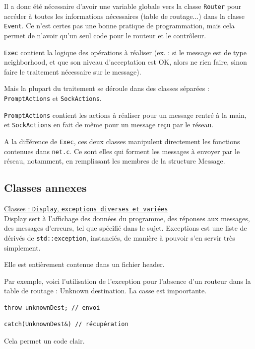 \documentclass[a4paper,11pt]{article}
\begin{document}
Il a donc été nécessaire d'avoir une variable globale vers la classe \texttt{Router} pour accéder à toutes les informations nécessaires (table de routage...) dans la classe \texttt{Event}.
Ce n'est certes pas une bonne pratique de programmation, mais cela permet de n'avoir qu'un seul code pour le routeur et le contrôleur.

\texttt{Exec} contient la logique des opérations à réaliser (ex. : si le message est de type neighborhood, et que son niveau d'acceptation est OK, alors ne rien faire, sinon faire le traitement nécessaire sur le message).

Mais la plupart du traitement se déroule dans des classes séparées : \texttt{PromptActions} et \texttt{SockActions}.

\texttt{PromptActions} contient les actions à réaliser pour un message rentré à la main, et \texttt{SockActions} en fait de
même pour un message reçu par le réseau.

A la différence de \texttt{Exec}, ces deux classes manipulent directement les fonctions contenues dans \texttt{net.c}.
Ce sont elles qui forment les messages à envoyer par le réseau, notamment, en remplissant les membres de la structure Message.

\subsection{Classes annexes}

\underline{Classes : \texttt{Display}, \texttt{exceptions diverses et variées}}\\

Display sert à l'affichage des données du programme, des réponses aux messages, des messages d'erreurs, tel que spécifié dans le sujet.
Exceptions est une liste de dérivés de \texttt{std::exception}, instanciés, de manière à pouvoir s'en servir très simplement.

Elle est entièrement contenue dans un fichier header.

Par exemple, voici l'utilisation de l'exception pour l'absence d'un routeur dans la table de routage : Unknown destination.
La casse est impoortante.

\begin{lstlisting}
throw unknownDest; // envoi
\end{lstlisting}

\begin{lstlisting}
catch(UnknownDest&) // récupération
\end{lstlisting}

Cela permet un code clair.
\end{document}
